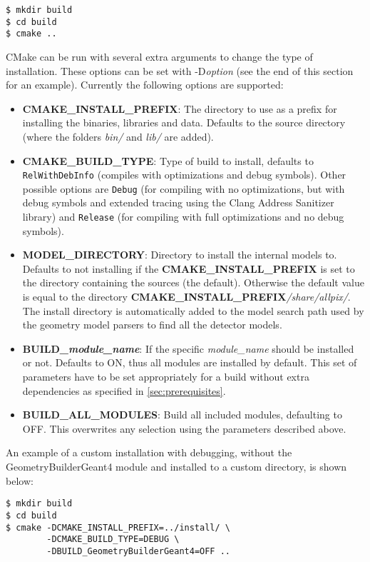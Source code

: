 \begin{verbatim}
$ mkdir build
$ cd build
$ cmake ..
\end{verbatim}

CMake can be run with several extra arguments to change the type of installation. These options can be set with -D\textit{option} (see the end of this section for an example). Currently the following options are supported:
\begin{itemize}
\item \textbf{CMAKE\_INSTALL\_PREFIX}: The directory to use as a prefix for installing the binaries, libraries and data. Defaults to the source directory (where the folders \textit{bin/} and \textit{lib/} are added). 
\item \textbf{CMAKE\_BUILD\_TYPE}: Type of build to install, defaults to \texttt{RelWithDebInfo} (compiles with optimizations and debug symbols). Other possible options are \texttt{Debug} (for compiling with no optimizations, but with debug symbols and extended tracing using the Clang Address Sanitizer library) and \texttt{Release} (for compiling with full optimizations and no debug symbols). 
\item \textbf{MODEL\_DIRECTORY}: Directory to install the internal models to. Defaults to not installing if the \textbf{CMAKE\_INSTALL\_PREFIX} is set to the directory containing the sources (the default). Otherwise the default value is equal to the directory \textbf{CMAKE\_INSTALL\_PREFIX}\-\textit{/share/allpix/}. The install directory is automatically added to the model search path used by the geometry model parsers to find all the detector models.
\item \textbf{BUILD\_\textit{module\_name}}: If the specific \textit{module\_name} should be installed or not. Defaults to ON, thus all modules are installed by default. This set of parameters have to be set appropriately for a build without extra dependencies as specified in \ref{sec:prerequisites}.
\item \textbf{BUILD\_ALL\_MODULES}: Build all included modules, defaulting to OFF. This overwrites any selection using the parameters described above.
\end{itemize}

An example of a custom installation with debugging, without the GeometryBuilderGeant4 module and installed to a custom directory, is shown below:
\begin{verbatim}
$ mkdir build
$ cd build
$ cmake -DCMAKE_INSTALL_PREFIX=../install/ \
        -DCMAKE_BUILD_TYPE=DEBUG \
        -DBUILD_GeometryBuilderGeant4=OFF ..
\end{verbatim}


